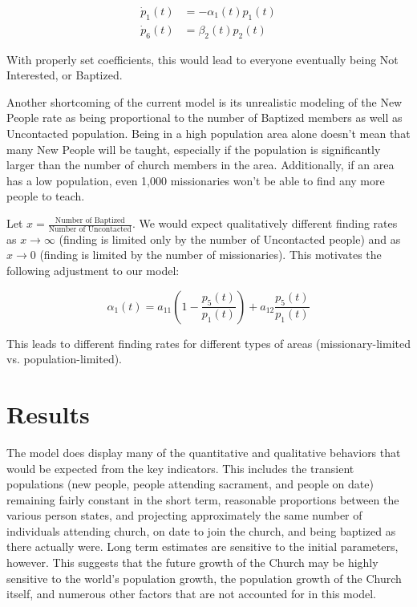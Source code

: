 \documentclass[11pt]{amsart}
\begin{document}
\begin{equation}
\begin{aligned}
\dot{p}_1(t) &= - \alpha_1(t) p_1(t)
\\
\dot{p}_6(t) &= \beta_2(t) p_2(t)
\end{aligned}
\end{equation}

With properly set coefficients, this would lead to everyone eventually being Not Interested, or Baptized.

Another shortcoming of the current model is its unrealistic modeling of the New People rate as being proportional to the number of Baptized members as well as Uncontacted population. Being in a high population area alone doesn't mean that many New People will be taught, especially if the population is significantly larger than the number of church members in the area. Additionally, if an area has a low population, even 1,000 missionaries won't be able to find any more people to teach.

Let $x = \frac{\text{Number of Baptized}}{\text{Number of Uncontacted}}$. We would expect qualitatively different finding rates as $x \to \infty$ (finding is limited only by the number of Uncontacted people) and as $x \to 0$ (finding is limited by the number of missionaries). This motivates the following adjustment to our model:

\begin{equation}
\alpha_1(t) = a_{11} \left(1- \frac{p_5(t)}{p_1(t)}\right) + a_{12}\frac{p_5(t)}{p_1(t)}
\end{equation}

This leads to different finding rates for different types of areas (missionary-limited vs. population-limited). 

\section{Results}

The model does display many of the quantitative and qualitative behaviors that would be expected from the key indicators. This includes the transient populations (new people, people attending sacrament, and people on date) remaining fairly constant in the short term, reasonable proportions between the various person states, and projecting approximately the same number of individuals attending church, on date to join the church, and being baptized as there actually were. Long term estimates are sensitive to the initial parameters, however. This suggests that the future growth of the Church may be highly sensitive to the world's population growth, the population growth of the Church itself, and numerous other factors that are not accounted for in this model.
\end{document}
